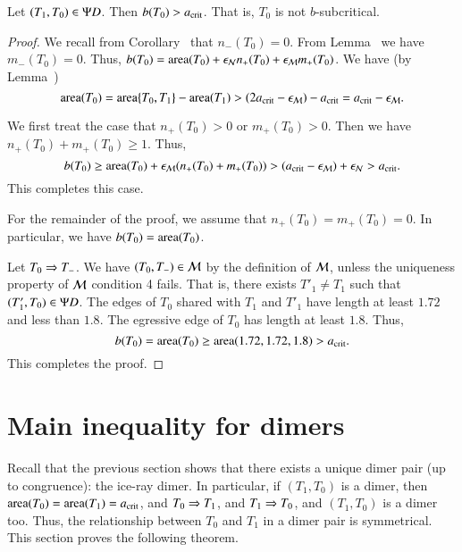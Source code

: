 \begin{lemma}  
  Let $(T_1,T_0)\in\Psi D$.  Then $b(T_0) > a_\text{crit}$.  That is, $T_0$ is
  not $b$-subcritical.
\end{lemma}

\begin{proof}
  We recall from Corollary~ that $n_-(T_0)=0$.  From
  Lemma~ we have $m_-(T_0)=0$.  Thus, $b(T_0) =
  {\operatorname{area}}(T_0) + \epsilon_{\mathcal N} n_+(T_0) + \epsilon_{\mathcal M} m_+(T_0)$.  We have
  (by Lemma~)
\[
{\operatorname{area}}(T_0) = {\operatorname{area}}\{T_0,T_1\} - {\operatorname{area}}(T_1) 
> (2a_\text{crit}-\epsilon_{\mathcal M}) -a_\text{crit} = a_\text{crit} - \epsilon_{\mathcal M}.
\]

We first treat the case that $n_+(T_0)>0$ or $m_+(T_0)>0$.  Then we
have $n_+(T_0)+m_+(T_0)\ge 1$.  Thus,
\[
b(T_0) \ge {\operatorname{area}}(T_0) + \epsilon_{\mathcal M} (n_+(T_0)+m_+(T_0)) > (a_\text{crit} - \epsilon_{\mathcal M})
+ \epsilon_{\mathcal N} > a_\text{crit}.
\]
This completes this case.

For the remainder of the proof, we assume that $n_+(T_0)=m_+(T_0)=0$.  In
particular, we have $b(T_0) = {\operatorname{area}}(T_0)$.


Let $T_0\Rightarrow T_-$.  We have $(T_0,T_-)\in\mathcal M$ by the definition of $\mathcal M$,
unless the uniqueness property of $\mathcal M$ condition 4 fails.  That is,
there exists $T'_1\ne T_1$ such that $(T'_1,T_0)\in\Psi D$.  The edges of
$T_0$ shared with $T_1$ and $T'_1$ have length at least $1.72$ and
less than $1.8$.  The egressive edge of $T_0$ has length at least
$1.8$.  Thus,
\[
b(T_0) = {\operatorname{area}} (T_0) \ge {\operatorname{area}}(1.72,1.72,1.8) > a_\text{crit}.
\]
This completes the proof.
\end{proof}


\section{Main inequality for dimers}

Recall that the previous section shows that there exists a unique
dimer pair (up to congruence): the ice-ray dimer.  In particular, if
$(T_1,T_0)$ is a dimer, then ${\operatorname{area}}(T_0)={\operatorname{area}}(T_1)=a_\text{crit}$, and
$T_0\Rightarrow T_1$, and $T_1\Rightarrow T_0$, and $(T_1,T_0)$ is a dimer too.  Thus,
the relationship between $T_0$ and $T_1$ in a dimer pair is
symmetrical.  This section proves the following theorem.

